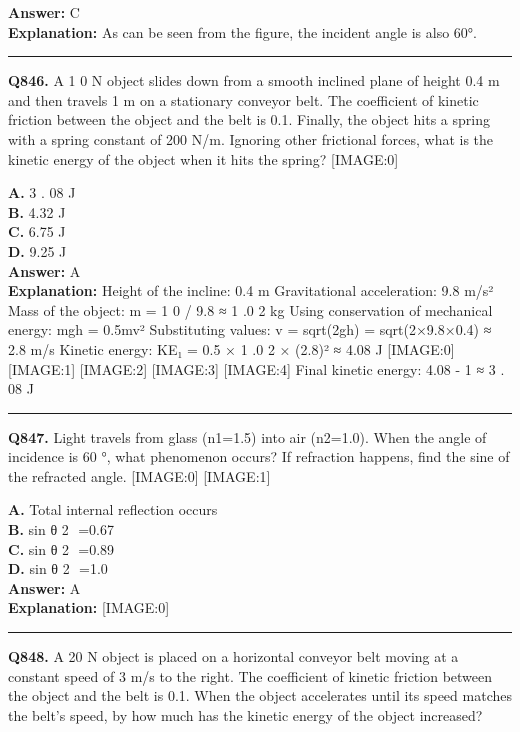 \documentclass[12pt]{article}
\begin{document}
\textbf{Answer:} C \\
\textbf{Explanation:} As can be seen from the figure, the incident angle is also 60°.

\hrule
\vspace{1em}


\noindent
\textbf{Q846.} A
1
0 N object slides down from a smooth inclined plane of height 0.4 m and then travels 1 m on a stationary conveyor belt. The coefficient of kinetic friction between the object and the belt is 0.1. Finally, the object hits a spring with a spring constant of 200 N/m. Ignoring other frictional forces, what is the kinetic energy of the object when it hits the spring?
[IMAGE:0]



\textbf{A.} 3
.
08
J \\
\textbf{B.} 4.32 J \\
\textbf{C.} 6.75 J \\
\textbf{D.} 9.25 J \\

\textbf{Answer:} A \\
\textbf{Explanation:} Height of the incline: 0.4 m
Gravitational acceleration: 9.8 m/s²
Mass of the object: m =
1
0 / 9.8 ≈
1
.0
2
kg
Using conservation of mechanical energy: mgh = 0.5mv²
Substituting values: v = sqrt(2gh) = sqrt(2×9.8×0.4) ≈ 2.8 m/s
Kinetic energy: KE₁ = 0.5 ×
1
.0
2
× (2.8)² ≈
4.08
J
[IMAGE:0]
[IMAGE:1]
[IMAGE:2]
[IMAGE:3]
[IMAGE:4]
Final kinetic energy:
4.08
-
1
≈
3
.
08
J

\hrule
\vspace{1em}


\noindent
\textbf{Q847.} Light travels from glass (n1=1.5) into air (n2=1.0). When the angle of incidence is
60
°, what phenomenon occurs? If refraction happens, find the sine of the refracted angle.
[IMAGE:0]
[IMAGE:1]



\textbf{A.} Total internal reflection occurs \\
\textbf{B.} sin
θ
2
​
=0.67 \\
\textbf{C.} sin
θ
2
​
=0.89 \\
\textbf{D.} sin
θ
2
​
=1.0 \\

\textbf{Answer:} A \\
\textbf{Explanation:} [IMAGE:0]

\hrule
\vspace{1em}


\noindent
\textbf{Q848.} A 20 N object is placed on a horizontal conveyor belt moving at a constant speed of 3 m/s to the right. The coefficient of kinetic friction between the object and the belt is 0.1. When the object accelerates until its speed matches the belt's speed, by how much has the kinetic energy of the object increased?
\end{document}
